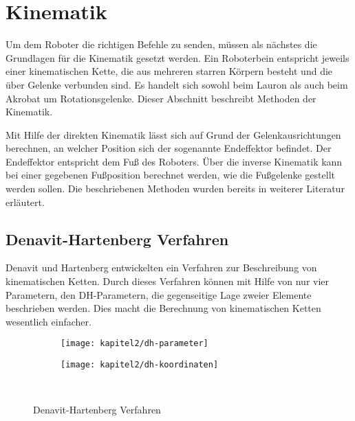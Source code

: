 \section{Kinematik}

Um dem Roboter die richtigen Befehle zu senden, müssen als nächstes die Grundlagen für die Kinematik gesetzt werden. Ein Roboterbein entspricht jeweils einer kinematischen Kette, die aus mehreren starren Körpern besteht und die über Gelenke verbunden sind. Es handelt sich sowohl beim Lauron als auch beim Akrobat um Rotationsgelenke. Dieser Abschnitt beschreibt Methoden der Kinematik.

Mit Hilfe der direkten Kinematik lässt sich auf Grund der Gelenkausrichtungen berechnen, an welcher Position sich der sogenannte Endeffektor befindet. Der Endeffektor entspricht dem Fuß des Roboters. Über die inverse Kinematik kann bei einer gegebenen Fußposition berechnet werden, wie die Fußgelenke gestellt werden sollen. Die beschriebenen Methoden wurden bereits in weiterer Literatur erläutert. \autocite{den55} \autocite{wloka92} \autocite{ihme02} \autocite{fellmann2007}

\subsection{Denavit-Hartenberg Verfahren}

Denavit und Hartenberg entwickelten ein Verfahren zur Beschreibung von kinematischen Ketten. Durch dieses Verfahren können mit Hilfe von nur vier Parametern, den DH-Parametern, die gegenseitige Lage zweier Elemente beschrieben werden. Dies macht die Berechnung von kinematischen Ketten wesentlich einfacher.

\begin{figure}[b!]
  \centering
  \begin{subfigure}[b]{.4\linewidth}
    \centering
    \texttt{[image: kapitel2/dh-parameter]}
    \label{kap2:dhparams}
  \end{subfigure}%
  \qquad
  \begin{subfigure}[b]{.4\linewidth}
    \centering
    \texttt{[image: kapitel2/dh-koordinaten]}
    \label{kap2:dhcoords}
  \end{subfigure}\\
  \caption{Denavit-Hartenberg Verfahren}
  \label{kap2lauron}
\end{figure}

